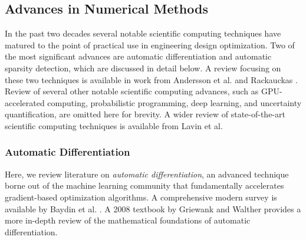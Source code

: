 %
%
%

\subsection{Advances in Numerical Methods}

In the past two decades several notable scientific computing techniques have matured to the point of practical use in engineering design optimization. Two of the most significant advances are automatic differentiation and automatic sparsity detection, which are discussed in detail below. A review focusing on these two techniques is available in work from Andersson et al. \cite{casadi} and Rackauckas \cite{rackauckas_generalizing_2021}. Review of several other notable scientific computing advances, such as GPU-accelerated computing, probabilistic programming, deep learning, and uncertainty quantification, are omitted here for brevity. A wider review of state-of-the-art scientific computing techniques is available from Lavin et al. \cite{lavin_simulation_2022}

\subsubsection{Automatic Differentiation}

Here, we review literature on \textit{automatic differentiation}, an advanced technique borne out of the machine learning community that fundamentally accelerates gradient-based optimization algorithms. A comprehensive modern survey is available by Baydin et al. \cite{baydin_automatic_2018}. A 2008 textbook by Griewank and Walther \cite{griewank_evaluating_2008} provides a more in-depth review of the mathematical foundations of automatic differentiation.

